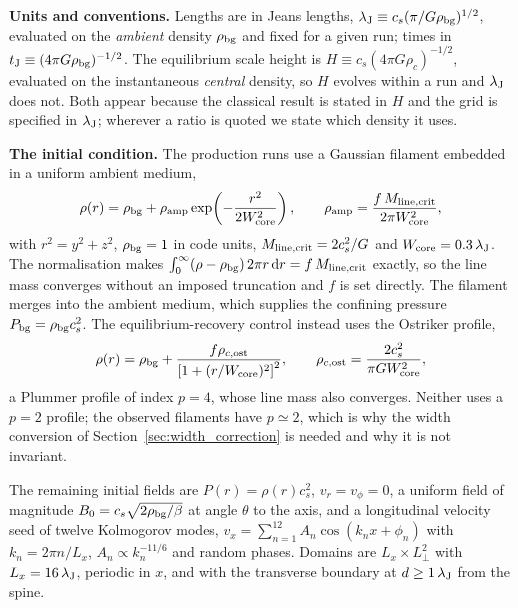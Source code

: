 \documentclass[usenatbib,twoside,twocolumn]{mnras}
\begin{document}
\smallskip\noindent\textbf{Units and conventions.} Lengths are in Jeans lengths, $\lambda_{\rm J}\equiv c_s(\pi/G\rho_{\rm bg})^{1/2}$, evaluated on the \emph{ambient} density $\rho_{\rm bg}$ and fixed for a given run; times in $t_{\rm J}\equiv(4\pi G\rho_{\rm bg})^{-1/2}$. The equilibrium scale height is $H\equiv c_s(4\pi G\rho_c)^{-1/2}$, evaluated on the instantaneous \emph{central} density, so $H$ evolves within a run and $\lambda_{\rm J}$ does not. Both appear because the classical result is stated in $H$ and the grid is specified in $\lambda_{\rm J}$; wherever a ratio is quoted we state which density it uses.

\smallskip\noindent\textbf{The initial condition.} The production runs use a Gaussian filament embedded in a uniform ambient medium,
\begin{equation}
\rho(r)=\rho_{\rm bg}+\rho_{\rm amp}\exp\!\left(-\frac{r^{2}}{2W_{\rm core}^{2}}\right),\qquad
\rho_{\rm amp}=\frac{f\,M_{\rm line,crit}}{2\pi W_{\rm core}^{2}},
\label{eq:ic_gauss}
\end{equation}
with $r^{2}=y^{2}+z^{2}$, $\rho_{\rm bg}=1$ in code units, $M_{\rm line,crit}=2c_s^{2}/G$ and $W_{\rm core}=0.3\,\lambda_{\rm J}$. The normalisation makes $\int_0^\infty(\rho-\rho_{\rm bg})\,2\pi r\,{\rm d}r=f\,M_{\rm line,crit}$ exactly, so the line mass converges without an imposed truncation and $f$ is set directly. The filament merges into the ambient medium, which supplies the confining pressure $P_{\rm bg}=\rho_{\rm bg}c_s^{2}$. The equilibrium-recovery control instead uses the Ostriker profile,
\begin{equation}
\rho(r)=\rho_{\rm bg}+\frac{f\rho_{c,\rm ost}}{\left[1+(r/W_{\rm core})^{2}\right]^{2}},\qquad
\rho_{c,\rm ost}=\frac{2c_s^{2}}{\pi G W_{\rm core}^{2}},
\label{eq:ic_ost}
\end{equation}
a Plummer profile of index $p=4$, whose line mass also converges. Neither uses a $p=2$ profile; the observed filaments have $p\simeq2$, which is why the width conversion of Section~\ref{sec:width_correction} is needed and why it is not invariant.

The remaining initial fields are $P(r)=\rho(r)c_s^{2}$, $v_r=v_\phi=0$, a uniform field of magnitude $B_0=c_s\sqrt{2\rho_{\rm bg}/\beta}$ at angle $\theta$ to the axis, and a longitudinal velocity seed of twelve Kolmogorov modes, $v_x=\sum_{n=1}^{12}A_n\cos(k_nx+\phi_n)$ with $k_n=2\pi n/L_x$, $A_n\propto k_n^{-11/6}$ and random phases. Domains are $L_x\times L_\perp^{2}$ with $L_x=16\,\lambda_{\rm J}$, periodic in $x$, and with the transverse boundary at $d\geq1\,\lambda_{\rm J}$ from the spine.
\end{document}
